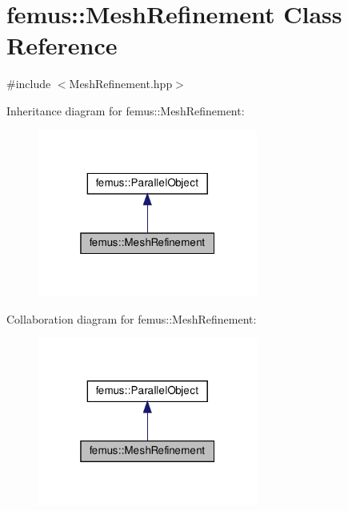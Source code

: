 \hypertarget{classfemus_1_1_mesh_refinement}{}\section{femus\+:\+:Mesh\+Refinement Class Reference}
\label{classfemus_1_1_mesh_refinement}


{\ttfamily \#include $<$Mesh\+Refinement.\+hpp$>$}



Inheritance diagram for femus\+:\+:Mesh\+Refinement\+:
\nopagebreak
\begin{figure}[H]
\begin{center}
\leavevmode
\includegraphics[width=205pt]{classfemus_1_1_mesh_refinement__inherit__graph}
\end{center}
\end{figure}


Collaboration diagram for femus\+:\+:Mesh\+Refinement\+:
\nopagebreak
\begin{figure}[H]
\begin{center}
\leavevmode
\includegraphics[width=205pt]{classfemus_1_1_mesh_refinement__coll__graph}
\end{center}
\end{figure}
